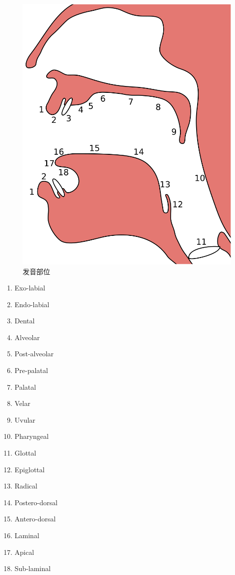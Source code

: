 \documentclass{ctexart}
\begin{document}
\subsubsection*{}
\begin{figure}[!t]
\centering
\includegraphics[width=.7\linewidth]{800px-Places_of_articulation.svg.png}
\caption{发音部位}
\end{figure}
\begin{multicols}{3}
\begin{enumerate}
\item Exo-labial
\item Endo-labial
\item Dental
\item Alveolar
\item Post-alveolar
\item Pre-palatal
\item Palatal
\item Velar
\item Uvular
\item Pharyngeal
\item Glottal
\item Epiglottal
\item Radical
\item Postero-dorsal
\item Antero-dorsal
\item Laminal
\item Apical
\item Sub-laminal
\end{enumerate}
\end{multicols}
\end{document}
